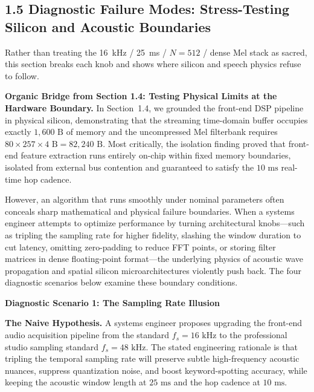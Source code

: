\documentclass[11pt,a4paper]{article}
\newcommand{\diagsec}[1]{\vspace{1.6pt}\textbf{\large #1}\vspace{0.5pt}\par}
\begin{document}
\setlength{\abovedisplayskip}{1.0pt}
\setlength{\belowdisplayskip}{1.0pt}

\subsection*{1.5 Diagnostic Failure Modes: Stress-Testing Silicon and Acoustic Boundaries}

\begin{learningobj}
Rather than treating the 16~kHz / 25~ms / $N=512$ / dense Mel stack as sacred, this section breaks each knob and shows where silicon and speech physics refuse to follow.
\end{learningobj}

\textbf{Organic Bridge from Section 1.4: Testing Physical Limits at the Hardware Boundary.} In Section~1.4, we grounded the front-end DSP pipeline in physical silicon, demonstrating that the streaming time-domain buffer occupies exactly $1{,}600\text{ B}$ of memory and the uncompressed Mel filterbank requires $80 \times 257 \times 4\text{ B} = 82{,}240\text{ B}$. Most critically, the isolation finding proved that front-end feature extraction runs entirely on-chip within fixed memory boundaries, isolated from external bus contention and guaranteed to satisfy the $10\text{ ms}$ real-time hop cadence.

However, an algorithm that runs smoothly under nominal parameters often conceals sharp mathematical and physical failure boundaries. When a systems engineer attempts to optimize performance by turning architectural knobs---such as tripling the sampling rate for higher fidelity, slashing the window duration to cut latency, omitting zero-padding to reduce FFT points, or storing filter matrices in dense floating-point format---the underlying physics of acoustic wave propagation and spatial silicon microarchitectures violently push back. The four diagnostic scenarios below examine these boundary conditions.

\diagsec{Diagnostic Scenario 1: The Sampling Rate Illusion}

\textbf{The Naive Hypothesis.} A systems engineer proposes upgrading the front-end audio acquisition pipeline from the standard $f_s = 16\text{ kHz}$ to the professional studio sampling standard $f_s = 48\text{ kHz}$. The stated engineering rationale is that tripling the temporal sampling rate will preserve subtle high-frequency acoustic nuances, suppress quantization noise, and boost keyword-spotting accuracy, while keeping the acoustic window length at $25\text{ ms}$ and the hop cadence at $10\text{ ms}$.
\end{document}
